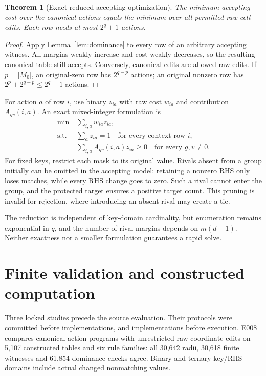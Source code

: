 \documentclass[11pt]{article}
\newtheorem{theorem}{Theorem}
\begin{document}
\begin{theorem}[Exact reduced accepting optimization]\label{thm:accepting}
The minimum accepting cost over the canonical actions equals the minimum over
all permitted raw cell edits. Each row needs at most $2^q+1$ actions.
\end{theorem}
\begin{proof}
Apply Lemma~\ref{lem:dominance} to every row of an arbitrary accepting witness.
All margins weakly increase and cost weakly decreases, so the resulting
canonical table still accepts. Conversely, canonical edits are allowed raw
edits. If $p=|M_0|$, an original-zero row has $2^{q-p}$ actions; an original
nonzero row has $2^p+2^{q-p}\leq2^q+1$ actions.
\end{proof}

For action $a$ of row $i$, use binary $z_{ia}$ with raw cost $w_{ia}$ and
contribution $A_{gv}(i,a)$. An exact mixed-integer formulation is
\begin{align*}
 \min\ &\sum_{i,a}w_{ia}z_{ia},\\
 \text{s.t. }&\sum_a z_{ia}=1\quad\text{for every context row }i,\\
 &\sum_{i,a}A_{gv}(i,a)z_{ia}\geq0\quad\text{for every }g,v\ne0.
\end{align*}
For fixed keys, restrict each mask to its original value. Rivals absent from a
group initially can be omitted in the accepting model: retaining a nonzero RHS
only loses matches, while every RHS change goes to zero. Such a rival cannot
enter the group, and the protected target ensures a positive target count.
This pruning is invalid for rejection, where introducing an absent rival may
create a tie.

The reduction is independent of key-domain cardinality, but enumeration remains
exponential in $q$, and the number of rival margins depends on $m(d-1)$.
Neither exactness nor a smaller formulation guarantees a rapid solve.

\section{Finite validation and constructed computation}
Three locked studies precede the source evaluation. Their protocols were
committed before implementations, and implementations before execution.
E008 compares canonical-action programs with unrestricted raw-coordinate edits
on 5,107 constructed tables and six rule families: all 30,642 radii, 30,618
finite witnesses and 61,854 dominance checks agree. Binary and ternary key/RHS
domains include actual changed nonmatching values.
\end{document}
